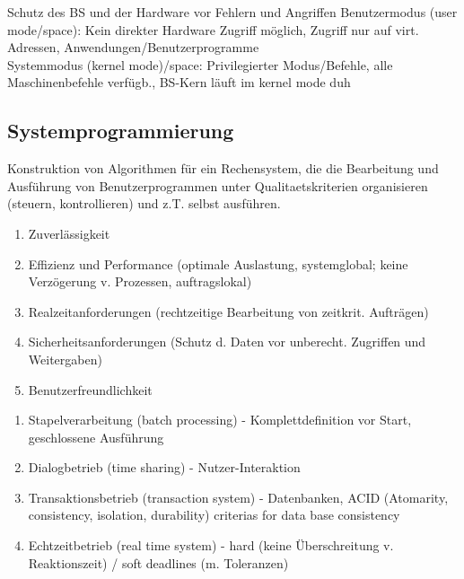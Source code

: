 Schutz des BS und der Hardware vor Fehlern und Angriffen
Benutzermodus (user mode/space): Kein direkter Hardware Zugriff möglich, Zugriff nur auf virt. Adressen, Anwendungen/Benutzerprogramme \\ Systemmodus (kernel mode)/space: Privilegierter Modus/Befehle, alle Maschinenbefehle verfügb., BS-Kern läuft im kernel mode duh 



\subsection{Systemprogrammierung}

\noindent Konstruktion von Algorithmen für ein Rechensystem, die die Bearbeitung und Ausführung von Benutzerprogrammen unter Qualitaetskriterien organisieren (steuern, kontrollieren) und z.T. selbst ausführen.

\begin{enumerate}
	\setlength\itemsep{0em}
	\item Zuverlässigkeit
	\item Effizienz und Performance (optimale Auslastung, systemglobal; keine Ver\-zögerung v. Prozessen, auftragslokal)
	\item Realzeitanforderungen (rechtzeitige Bearbeitung von zeitkrit. Aufträgen)
	\item Sicherheitsanforderungen (Schutz d. Daten vor unberecht. Zugriffen und Weiter\-gaben)
	\item Benutzerfreundlichkeit
\end{enumerate}

\begin{enumerate}
	\setlength\itemsep{0em}
	\item Stapelverarbeitung (batch processing) - Komplettdefinition vor Start, geschlossene Ausführung
	\item Dialogbetrieb (time sharing) - Nutzer-Interaktion
	\item Transaktionsbetrieb (transaction system) - Datenbanken, ACID (Atomarity, consistency, isolation, durability) criterias for data base consistency
	\item Echtzeitbetrieb (real time system) - hard (keine Überschreitung v. Reaktionszeit) / soft deadlines (m. Toleranzen)
\end{enumerate}

